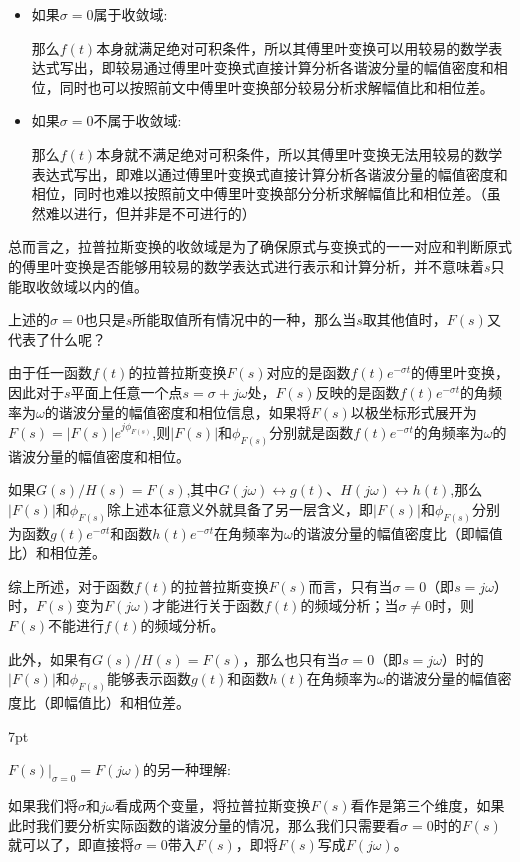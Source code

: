 \documentclass{article}
\numberwithin{equation}{section}
\numberwithin{figure}{section}
\newenvironment{formal}{%
\def\FrameCommand{%
\hspace{1pt}%
{\color{DarkBlue}\vrule width 2pt}%
{\color{formalshade}\vrule width 4pt}%
\colorbox{formalshade}%
}%
\MakeFramed{\advance\hsize-\width\FrameRestore}%
\noindent\hspace{-4.55pt}%
\begin{adjustwidth}{}{7pt}%
\vspace{2pt}\vspace{2pt}%
}
{%
\vspace{2pt}\end{adjustwidth}\endMakeFramed%
}
\begin{document}
\begin{itemize}
    \item 如果$\sigma = 0$属于收敛域:
    
    那么$f(t)$本身就满足绝对可积条件，所以其傅里叶变换可以用较易的数学表达式写出，即较易通过傅里叶变换式直接计算分析各谐波分量的幅值密度和相位，同时也可以按照前文中傅里叶变换部分较易分析求解幅值比和相位差。
    \item 如果$\sigma = 0$不属于收敛域:
    
    那么$f(t)$本身就不满足绝对可积条件，所以其傅里叶变换无法用较易的数学表达式写出，即难以通过傅里叶变换式直接计算分析各谐波分量的幅值密度和相位，同时也难以按照前文中傅里叶变换部分分析求解幅值比和相位差。（虽然难以进行，但并非是不可进行的）
\end{itemize}

总而言之，拉普拉斯变换的收敛域是为了确保原式与变换式的一一对应和判断原式的傅里叶变换是否能够用较易的数学表达式进行表示和计算分析，并不意味着$s$只能取收敛域以内的值。

上述的$\sigma=0$也只是$s$所能取值所有情况中的一种，那么当$s$取其他值时，$F(s)$又代表了什么呢？

由于任一函数$f(t)$的拉普拉斯变换$F(s)$对应的是函数$f(t)e^{-\sigma t}$的傅里叶变换，因此对于$s$平面上任意一个点$s=\sigma+j\omega$处，$F(s)$反映的是函数$f(t)e^{-\sigma t}$的角频率为$\omega$的谐波分量的幅值密度和相位信息，如果将$F(s)$以极坐标形式展开为$F(s)=|F(s)|e^{j\phi_{F(s)}}$,则$|F(s)|$和$\phi_{F(s)}$分别就是函数$f(t)e^{-\sigma t}$的角频率为$\omega$的谐波分量的幅值密度和相位。

如果$G(s)/H(s)=F(s)$,其中$G(j\omega)\leftrightarrow g(t)$、$H(j\omega)\leftrightarrow h(t)$,那么$|F(s)|$和$\phi_{F(s)}$除上述本征意义外就具备了另一层含义，即$|F(s)|$和$\phi_{F(s)}$分别为函数$g(t)e^{-\sigma t}$和函数$h(t)e^{-\sigma t}$在角频率为$\omega$的谐波分量的幅值密度比（即幅值比）和相位差。

综上所述，对于函数$f(t)$的拉普拉斯变换$F(s)$而言，只有当$\sigma = 0$（即$s=j\omega$）时，$F(s)$变为$F(j\omega)$才能进行关于函数$f(t)$的频域分析；当$\sigma ≠ 0$时，则$F(s)$不能进行$f(t)$的频域分析。

此外，如果有$G(s)/H(s)=F(s)$，那么也只有当$\sigma = 0$（即$s=j\omega$）时的$|F(s)|$和$\phi_{F(s)}$能够表示函数$g(t)$和函数$h(t)$在角频率为$\omega$的谐波分量的幅值密度比（即幅值比）和相位差。

\begin{formal}
    $F(s)|_{\sigma=0}=F(j\omega)$的另一种理解:

    如果我们将$\sigma$和$j\omega$看成两个变量，将拉普拉斯变换$F(s)$看作是第三个维度，如果此时我们要分析实际函数的谐波分量的情况，那么我们只需要看$\sigma=0$时的$F(s)$就可以了，即直接将$\sigma=0$带入$F(s)$，即将$F(s)$写成$F(j\omega)$。
\end{formal}
\end{document}
